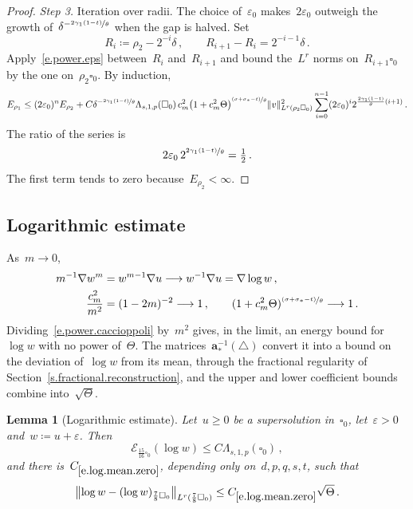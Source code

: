 \documentclass[11pt,letterpaper]{article}
\numberwithin{equation}{section}
\newtheorem{lemma}[theorem]{Lemma}
\theoremstyle{definition}
\renewcommand{\a}{\mathbf{a}}
\newcommand{\eps}{\varepsilon}
\newcommand{\nf}{\nicefrac}
\newcommand{\cu}{\square}
\DeclarePairedDelimiter{\norm}{\lVert}{\rVert}
\newcommand{\Ener}{\mathcal E}
\begin{document}
\begin{proof}
\smallskip

\emph{Step 3.} Iteration over radii. The choice of~$\eps_0$ makes~$2\eps_0$ outweigh the growth of~$\delta^{-\nf{2\gamma_1(1-t)}\theta}$ when the gap is halved. Set
\begin{equation*}
	R_i\coloneqq\rho_2-2^{-i}\delta\,,\qquad R_{i+1}-R_i=2^{-i-1}\delta\,.
\end{equation*}
Apply~\eqref{e.power.eps} between~$R_i$ and~$R_{i+1}$ and bound the~$L^r$ norms on~$R_{i+1}\cu_0$ by the one on~$\rho_2\cu_0$. By induction,
\begin{equation*}
	E_{\rho_1}\leq(2\eps_0)^nE_{\rho_2}+C\delta^{-\nf{2\gamma_1(1-t)}\theta}\Lambda_{s,1,p}(\cu_0)\,c_m^2\bigl(1+c_m^2\Theta\bigr)^{\nf{(\sigma+\sigma_*-t)}\theta}\norm{v}_{L^r(\rho_2\cu_0)}^2\sum_{i=0}^{n-1}(2\eps_0)^i2^{\frac{2\gamma_1(1-t)}\theta(i+1)}\,.
\end{equation*}
The ratio of the series is
\begin{equation*}
	2\eps_0\,2^{\nf{2\gamma_1(1-t)}\theta}=\tfrac12\,.
\end{equation*}
The first term tends to zero because~$E_{\rho_2}<\infty$.
\end{proof}

\subsection{Logarithmic estimate}

As~$m\to0$,
\begin{align*}
	m^{-1}\nabla w^m&=w^{m-1}\nabla u\longrightarrow w^{-1}\nabla u=\nabla\log w\,,\\
	\frac{c_m^2}{m^2}&=(1-2m)^{-2}\longrightarrow1\,,\qquad(1+c_m^2\Theta)^{\nf{(\sigma+\sigma_*-t)}\theta}\longrightarrow1\,.
\end{align*}
Dividing~\eqref{e.power.caccioppoli} by~$m^2$ gives, in the limit, an energy bound for~$\log w$ with no power of~$\Theta$. The matrices~$\a_*^{-1}(\triangle)$ convert it into a bound on the deviation of~$\log w$ from its mean, through the fractional regularity of Section~\ref{s.fractional.reconstruction}, and the upper and lower coefficient bounds combine into~$\sqrt\Theta$.

\begin{lemma}[Logarithmic estimate]
\label{l.log.estimate}
Let~$u\geq0$ be a supersolution in~$\cu_0$, let~$\eps>0$ and~$w\coloneqq u+\eps$. Then
\begin{equation}
	\Ener_{\frac{15}{16}\cu_0}(\log w)\leq C\Lambda_{s,1,p}(\cu_0)\,,
	\label{e.log.energy}
\end{equation}
and there is~$C_{\eqref{e.log.mean.zero}}$, depending only on~$d,p,q,s,t$, such that
\begin{equation}
	\norm[\big]{\log w-(\log w)_{\frac78\cu_0}}_{L^r(\frac78\cu_0)}\leq C_{\eqref{e.log.mean.zero}}\sqrt\Theta\,.
	\label{e.log.mean.zero}
\end{equation}
\end{lemma}
\end{document}
